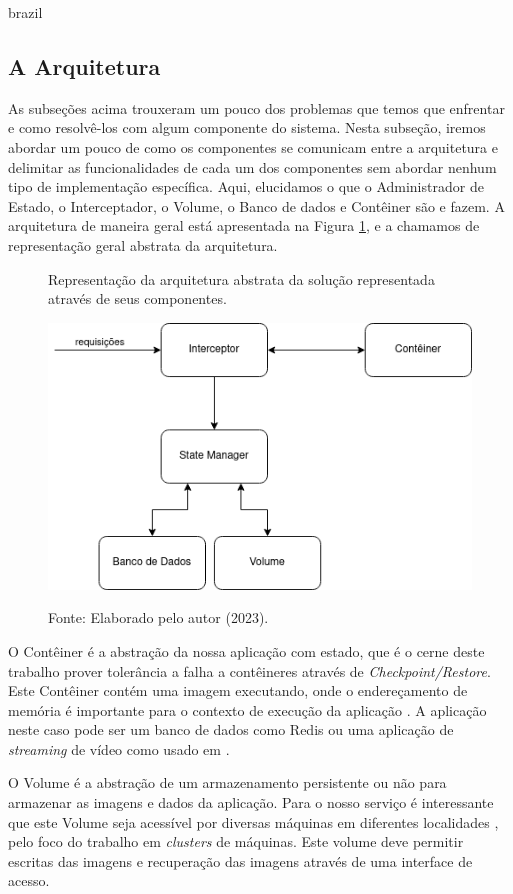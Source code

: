 \begin{otherlanguage*}{brazil}
\subsection{A Arquitetura}

As subseções acima trouxeram um pouco dos problemas que temos que enfrentar e como
resolvê-los com algum componente do sistema. Nesta subseção, iremos
abordar um pouco de como os componentes se comunicam entre a arquitetura e delimitar as
funcionalidades de cada um dos componentes sem abordar nenhum tipo de implementação
específica. Aqui, elucidamos o que o Administrador de Estado, o Interceptador, o Volume, o
Banco de dados e Contêiner são e fazem. A arquitetura de maneira geral está apresentada na Figura
\ref{fig:abstract-architecture}, e a chamamos de representação geral abstrata da arquitetura.

\begin{figure}[h]
\centering
\caption{Representação da arquitetura abstrata da solução representada através de seus componentes.}
\includegraphics[scale=0.8]{images/abstract-architecture.png}
\label{fig:abstract-architecture}
\caption*{Fonte: Elaborado pelo autor (2023).}
\end{figure}

O Contêiner é a abstração da nossa aplicação com estado, que é o cerne deste trabalho
prover tolerância a falha a contêineres através de \textit{Checkpoint/Restore}. Este Contêiner
contém uma imagem executando, onde o endereçamento de memória é importante para o contexto
de execução da aplicação \cite{Chen2015/10}. A aplicação neste caso pode ser um banco
de dados como Redis ou uma aplicação de \textit{streaming} de vídeo como usado em \cite{vayghan2021kubernetes}.

O Volume é a abstração de um armazenamento persistente ou não para armazenar as imagens e
dados da aplicação. Para o nosso serviço é interessante que este Volume seja acessível
por diversas máquinas em diferentes localidades \cite{vayghan2021kubernetes}, pelo foco
do trabalho em \textit{clusters} de máquinas. Este volume deve permitir escritas das imagens
e recuperação das imagens através de uma interface de acesso.


\end{otherlanguage*}
